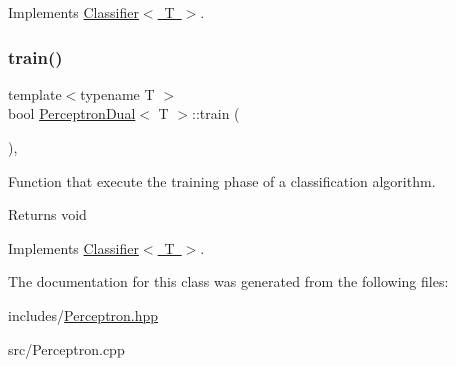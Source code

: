 Implements \mbox{\hyperlink{class_classifier_ab3b9544a8d9c3cbde8d5865c7e9be0fb}{Classifier$<$ T $>$}}.

\mbox{\label{class_perceptron_dual_ac5e6aac8184fdf8f9d39d8d183d49190}} 
\subsubsection{\texorpdfstring{train()}{train()}}
{\footnotesize\ttfamily template$<$typename T $>$ \\
bool \mbox{\hyperlink{class_perceptron_dual}{Perceptron\+Dual}}$<$ T $>$\+::train (\begin{DoxyParamCaption}{ }\end{DoxyParamCaption})\hspace{0.3cm}{\ttfamily [override]}, {\ttfamily [virtual]}}



Function that execute the training phase of a classification algorithm. 

\begin{DoxyReturn}{Returns}
void 
\end{DoxyReturn}


Implements \mbox{\hyperlink{class_classifier_a120849bfdfa3ba7a0388b32b2d76bf4f}{Classifier$<$ T $>$}}.



The documentation for this class was generated from the following files\+:\begin{DoxyCompactItemize}
\item 
includes/\mbox{\hyperlink{_perceptron_8hpp}{Perceptron.\+hpp}}\item 
src/Perceptron.\+cpp\end{DoxyCompactItemize}

